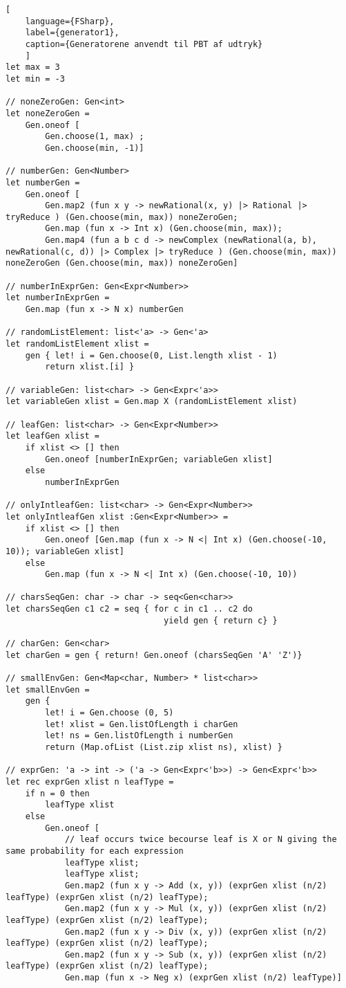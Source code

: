 \begin{lstlisting}[
    language={FSharp}, 
    label={generator1}, 
    caption={Generatorene anvendt til PBT af udtryk}
    ]
let max = 3
let min = -3

// noneZeroGen: Gen<int>
let noneZeroGen = 
    Gen.oneof [ 
        Gen.choose(1, max) ;
        Gen.choose(min, -1)]

// numberGen: Gen<Number>
let numberGen =
    Gen.oneof [
        Gen.map2 (fun x y -> newRational(x, y) |> Rational |> tryReduce ) (Gen.choose(min, max)) noneZeroGen;
        Gen.map (fun x -> Int x) (Gen.choose(min, max));
        Gen.map4 (fun a b c d -> newComplex (newRational(a, b), newRational(c, d)) |> Complex |> tryReduce ) (Gen.choose(min, max)) noneZeroGen (Gen.choose(min, max)) noneZeroGen]

// numberInExprGen: Gen<Expr<Number>>
let numberInExprGen = 
    Gen.map (fun x -> N x) numberGen

// randomListElement: list<'a> -> Gen<'a>
let randomListElement xlist = 
    gen { let! i = Gen.choose(0, List.length xlist - 1)
        return xlist.[i] }

// variableGen: list<char> -> Gen<Expr<'a>>
let variableGen xlist = Gen.map X (randomListElement xlist)

// leafGen: list<char> -> Gen<Expr<Number>>
let leafGen xlist =
    if xlist <> [] then
        Gen.oneof [numberInExprGen; variableGen xlist]
    else
        numberInExprGen

// onlyIntleafGen: list<char> -> Gen<Expr<Number>>
let onlyIntleafGen xlist :Gen<Expr<Number>> = 
    if xlist <> [] then
        Gen.oneof [Gen.map (fun x -> N <| Int x) (Gen.choose(-10, 10)); variableGen xlist]
    else
        Gen.map (fun x -> N <| Int x) (Gen.choose(-10, 10))

// charsSeqGen: char -> char -> seq<Gen<char>>
let charsSeqGen c1 c2 = seq { for c in c1 .. c2 do
                                yield gen { return c} }

// charGen: Gen<char>
let charGen = gen { return! Gen.oneof (charsSeqGen 'A' 'Z')}

// smallEnvGen: Gen<Map<char, Number> * list<char>>
let smallEnvGen =
    gen { 
        let! i = Gen.choose (0, 5)
        let! xlist = Gen.listOfLength i charGen
        let! ns = Gen.listOfLength i numberGen
        return (Map.ofList (List.zip xlist ns), xlist) }

// exprGen: 'a -> int -> ('a -> Gen<Expr<'b>>) -> Gen<Expr<'b>> 
let rec exprGen xlist n leafType = 
    if n = 0 then
        leafType xlist
    else
        Gen.oneof [
            // leaf occurs twice becourse leaf is X or N giving the same probability for each expression 
            leafType xlist; 
            leafType xlist;
            Gen.map2 (fun x y -> Add (x, y)) (exprGen xlist (n/2) leafType) (exprGen xlist (n/2) leafType);
            Gen.map2 (fun x y -> Mul (x, y)) (exprGen xlist (n/2) leafType) (exprGen xlist (n/2) leafType);
            Gen.map2 (fun x y -> Div (x, y)) (exprGen xlist (n/2) leafType) (exprGen xlist (n/2) leafType);
            Gen.map2 (fun x y -> Sub (x, y)) (exprGen xlist (n/2) leafType) (exprGen xlist (n/2) leafType);            
            Gen.map (fun x -> Neg x) (exprGen xlist (n/2) leafType)]



\end{lstlisting}
